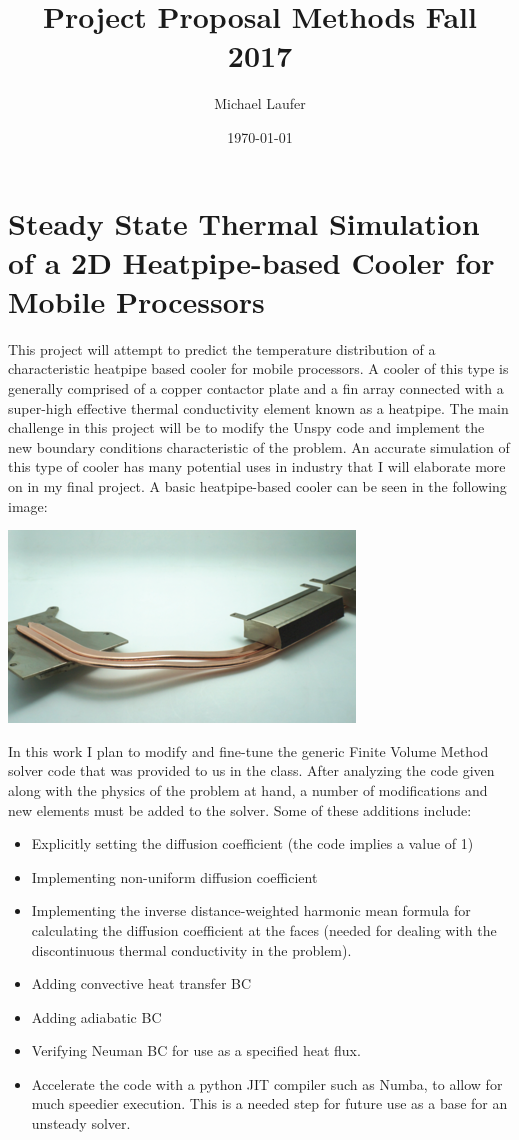 \documentclass[11pt]{article}
\author{Michael Laufer}
\date{\today}
\title{Project Proposal Methods Fall 2017}
\begin{document}
\maketitle
\section{Steady State Thermal Simulation of a 2D Heatpipe-based Cooler for Mobile Processors}
\label{sec:orgd18ea0b}
This project will attempt to predict the temperature distribution of a characteristic heatpipe based cooler for mobile processors. A cooler of this type is generally comprised of a copper contactor plate and a fin array connected with a super-high effective thermal conductivity element known as a heatpipe. The main challenge in this project will be to modify the Unspy code and implement the new boundary conditions characteristic of the problem. An accurate simulation of this type of cooler has many potential uses in industry that I will elaborate more on in my final project.
A basic heatpipe-based cooler can be seen in the following image:
\begin{center}
\includegraphics[width=.9\linewidth]{./figures/heatpipe.png}
\end{center}   \newpage
In this work I plan to modify and fine-tune the generic Finite Volume Method solver code that was provided to us in the class.  After analyzing the code given along with the physics of the problem at hand, a number of modifications and new elements must be added to the solver. 
Some of these additions include:
\begin{itemize}
\item Explicitly setting the diffusion coefficient (the code implies a value of 1)
\item Implementing non-uniform diffusion coefficient
\item Implementing the inverse distance-weighted harmonic mean formula for calculating the diffusion coefficient at the faces (needed for dealing with the discontinuous thermal conductivity in the problem).
\item Adding convective heat transfer BC
\item Adding adiabatic BC
\item Verifying Neuman BC for use as a specified heat flux.
\item Accelerate the code with a python JIT compiler such as Numba, to allow for much speedier execution. This is a needed step for future use as a base for an unsteady solver.
\end{itemize}
\end{document}
